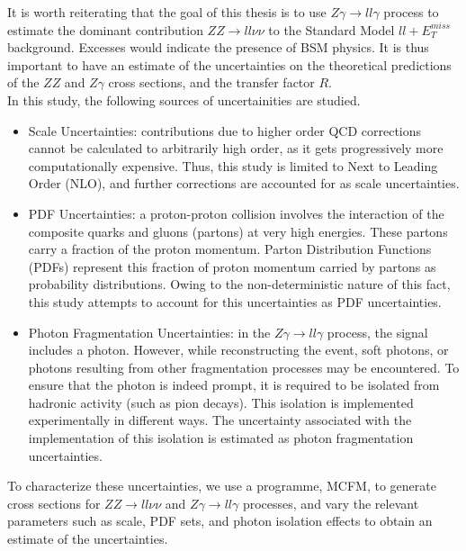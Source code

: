 \documentclass[11pt,a4paper]{report}
\newcommand{\ZZ}{$ZZ\to ll\nu\nu$ }
\newcommand{\Zg}{$Z\gamma\to ll\gamma$ }
\newcommand{\llM}{$ll+E_T^{miss}$ }
\begin{document}
It is worth reiterating that the goal of this thesis is to use \Zg process to estimate the dominant contribution \ZZ to the Standard Model \llM background. Excesses would indicate the presence of BSM physics. It is thus important to have an estimate of the uncertainties on the theoretical predictions of the $ZZ$ and $Z\gamma$ cross sections, and the transfer factor $R$.\\
In this study, the following sources of uncertainities are studied.
\begin{itemize}
\item Scale Uncertainties: contributions due to higher order QCD corrections cannot be calculated to arbitrarily high order, as it gets progressively more computationally expensive. Thus, this study is limited to Next to Leading Order (NLO), and further corrections are accounted for as scale uncertainties.
\item PDF Uncertainties: a proton-proton collision involves the interaction of the composite quarks and gluons (partons) at very high energies. These partons carry a fraction of the proton momentum. Parton Distribution Functions (PDFs) represent this fraction of proton momentum carried by partons as probability distributions. Owing to the non-deterministic nature of this fact, this study attempts to account for this uncertainties as PDF uncertainties.
\item Photon Fragmentation Uncertainties: in the \Zg process, the signal includes a photon. However, while reconstructing the event, soft photons, or photons resulting from other fragmentation processes may be encountered. To ensure that the photon is indeed prompt, it is required to be isolated from hadronic activity (such as pion decays). This isolation is implemented experimentally in different ways. The uncertainty associated with the implementation of this isolation is estimated as photon fragmentation uncertainties.
\end{itemize}

To characterize these uncertainties, we use a programme, MCFM, to generate cross sections for \ZZ and \Zg processes, and vary the relevant parameters such as scale, PDF sets, and photon isolation effects to obtain an estimate of the uncertainties.
\end{document}

